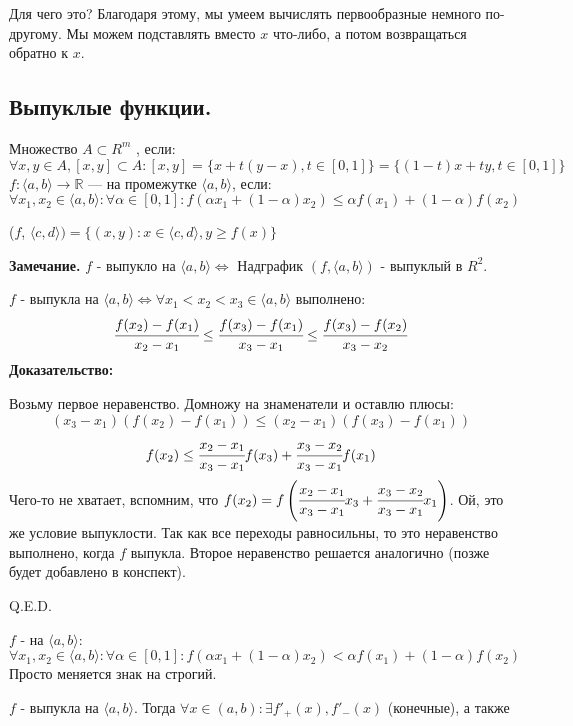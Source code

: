 Для чего это? Благодаря этому, мы умеем вычислять первообразные немного по-другому. Мы можем подставлять вместо $x$ что-либо, а потом возвращаться обратно к $x$.

\subsection{Выпуклые функции.}

Множество $A \subset R^m$ , если:
$$\forall x,y \in A , [x,y]\subset A: [x,y] = \{x+t(y-x), t\in[0,1]\} = \{(1-t)x + ty, t\in[0,1]\}$$
 $f:\langle a,b\rangle\rightarrow \mathbb{R}$ ---  на промежутке $\langle a,b\rangle$, если:
$$\forall x_1,x_2 \in \langle a,b \rangle: \forall \alpha \in[0,1]:f(\alpha x_1+(1-\alpha)x_2)\leq \alpha f(x_1) + (1-\alpha) f(x_2)$$

 ($f$, $\langle c,d \rangle) = \{(x,y): x\in \langle c,d \rangle, y \geq f(x)  \}$

\textbf{Замечание.} $f$ - выпукло на $\langle a,b\rangle \Leftrightarrow$ Надграфик $(f, \langle a,b \rangle)$ - выпуклый в $R^2$.


$f$ - выпукла на $\langle a,b\rangle \Leftrightarrow \forall x_1<x_2<x_3 \in\langle a,b \rangle$ выполнено:
$$\cfrac{f(x_2)-f(x_1)}{x_2-x_1} \leq \cfrac{f(x_3)-f(x_1)}{x_3-x_1}\leq \cfrac{f(x_3)-f(x_2)}{x_3-x_2}$$
\textbf{Доказательство:}

Возьму первое неравенство. Домножу на знаменатели и оставлю плюсы:
$$(x_3-x_1) (f(x_2)-f(x_1)) \leq (x_2-x_1) (f(x_3)-f(x_1))$$
$$f(x_2)\leq \cfrac{x_2-x_1}{x_3-x_1}f(x_3) + \cfrac{x_3-x_2}{x_3-x_1}f(x_1)$$
Чего-то не хватает, вспомним, что $f(x_2) = f\left (\cfrac{x_2-x_1}{x_3-x_1}x_3 +\cfrac{x_3-x_2}{x_3-x_1}x_1\right)$. Ой, это же условие выпуклости. Так как все переходы равносильны, то 
это неравенство выполнено, когда $f$ выпукла. Второе неравенство решается аналогично (позже будет добавлено в конспект).

\hfill Q.E.D.

$f$ -  на $\langle a,b\rangle$:
$$\forall x_1,x_2 \in \langle a,b \rangle: \forall \alpha \in[0,1]:f(\alpha x_1+(1-\alpha)x_2)< \alpha f(x_1) + (1-\alpha) f(x_2)$$
Просто меняется знак на строгий.


$f$ - выпукла на $\langle a,b \rangle$. Тогда $\forall x\in(a,b): \exists f'_+(x), f'_-(x)$ (конечные),  а также

